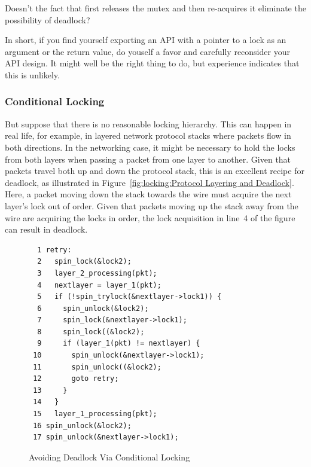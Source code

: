 \QuickQuiz{}
	Doesn't the fact that  first releases the
	mutex and then re-acquires it eliminate the possibility of deadlock?
 \QuickQuizEnd

In short, if you find yourself exporting an API with a pointer to a
lock as an argument or the return value, do youself a favor and carefully
reconsider your API design.
It might well be the right thing to do, but experience indicates that
this is unlikely.

\subsubsection{Conditional Locking}
\label{sec:locking:Conditional Locking}

But suppose that there is no reasonable locking hierarchy.
This can happen in real life, for example, in layered network protocol stacks
where packets flow in both directions.
In the networking case, it might be necessary to hold the locks from
both layers when passing a packet from one layer to another.
Given that packets travel both up and down the protocol stack, this
is an excellent recipe for deadlock, as illustrated in
Figure~\ref{fig:locking:Protocol Layering and Deadlock}.
Here, a packet moving down the stack towards the wire must acquire
the next layer's lock out of order.
Given that packets moving up the stack away from the wire are acquiring
the locks in order, the lock acquisition in line~4 of the figure
can result in deadlock.

\begin{figure}[tbp]
{ \scriptsize
\begin{verbatim}
  1 retry:
  2   spin_lock(&lock2);
  3   layer_2_processing(pkt);
  4   nextlayer = layer_1(pkt);
  5   if (!spin_trylock(&nextlayer->lock1)) {
  6     spin_unlock(&lock2);
  7     spin_lock(&nextlayer->lock1);
  8     spin_lock((&lock2);
  9     if (layer_1(pkt) != nextlayer) {
 10       spin_unlock(&nextlayer->lock1);
 11       spin_unlock((&lock2);
 12       goto retry;
 13     }
 14   }
 15   layer_1_processing(pkt);
 16 spin_unlock(&lock2);
 17 spin_unlock(&nextlayer->lock1);
\end{verbatim}
}
\caption{Avoiding Deadlock Via Conditional Locking}
\label{fig:locking:Avoiding Deadlock Via Conditional Locking}
\end{figure}

